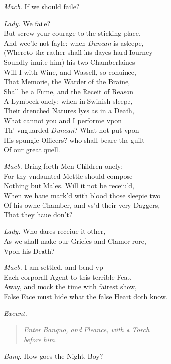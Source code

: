 \documentclass[12pt]{sides}
\newcommand{\StageDir}[1]{\begin{quote}\centering\em #1\end{quote}}
\newcommand{\dia}[1]{\hskip 15pt\textit{#1}\hskip 6pt}
\begin{document}
\begin{multicols}{2}
            \dia{Macb.} If we should faile?

            \dia{Lady.} We faile? \\ But screw your courage to the sticking place, \\ And wee'le not fayle: when \textit{Duncan} is asleepe, \\ (Whereto the rather shall his dayes hard Iourney \\ Soundly inuite him) his two Chamberlaines \\ Will I with Wine, and Wassell, so conuince, \\ That Memorie, the Warder of the Braine, \\ Shall be a Fume, and the Receit of Reason \\ A Lymbeck onely: when in Swinish sleepe, \\ Their drenched Natures lyes as in a Death, \\ What cannot you and I performe vpon \\ Th' vnguarded \textit{Duncan}? What not put vpon \\ His spungie Officers? who shall beare the guilt \\ Of our great quell.

            \dia{Macb.} Bring forth Men-Children onely: \\ For thy vndaunted Mettle should compose \\ Nothing but Males. Will it not be receiu'd, \\ When we haue mark'd with blood those sleepie two \\ Of his owne Chamber, and vs'd their very Daggers, \\ That they haue don't?

            \dia{Lady.} Who dares receiue it other, \\ As we shall make our Griefes and Clamor rore, \\ Vpon his Death?

            \dia{Macb.} I am settled, and bend vp \\ Each corporall Agent to this terrible Feat. \\ Away, and mock the time with fairest show, \\ False Face must hide what the false Heart doth know.
            
            \hfill\textit{Exeunt.}\hspace{48pt} %
            \StageDir{Enter Banquo, and Fleance, with a Torch \\ before him.}
            \dia{Banq.} How goes the Night, Boy?
            

\end{multicols}
\end{document}
